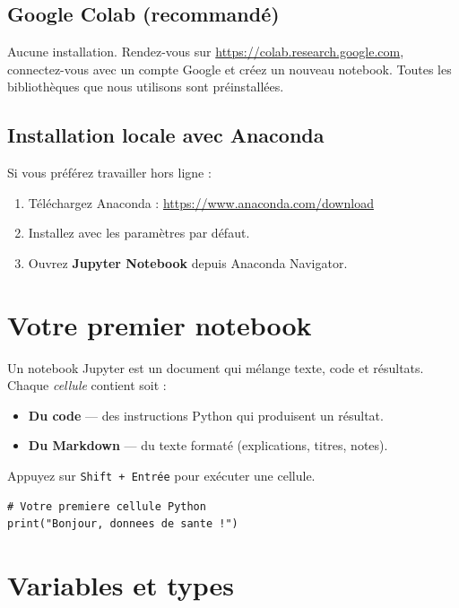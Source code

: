 \subsection{Google Colab (recommand\'e)}

Aucune installation. Rendez-vous sur \url{https://colab.research.google.com}, connectez-vous avec un compte Google et cr\'eez un nouveau notebook. Toutes les biblioth\`eques que nous utilisons sont pr\'einstall\'ees.

\subsection{Installation locale avec Anaconda}

Si vous pr\'ef\'erez travailler hors ligne :
\begin{enumerate}
  \item T\'el\'echargez Anaconda : \url{https://www.anaconda.com/download}
  \item Installez avec les param\`etres par d\'efaut.
  \item Ouvrez \textbf{Jupyter Notebook} depuis Anaconda Navigator.
\end{enumerate}

\section{Votre premier notebook}

Un notebook Jupyter est un document qui m\'elange texte, code et r\'esultats. Chaque \emph{cellule} contient soit :
\begin{itemize}
  \item \textbf{Du code} --- des instructions Python qui produisent un r\'esultat.
  \item \textbf{Du Markdown} --- du texte format\'e (explications, titres, notes).
\end{itemize}

Appuyez sur \texttt{Shift + Entr\'ee} pour ex\'ecuter une cellule.

\begin{verbatim}
# Votre premiere cellule Python
print("Bonjour, donnees de sante !")
\end{verbatim}

\section{Variables et types}

